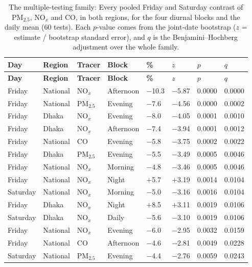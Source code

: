 \begingroup\scriptsize
\begin{longtable}{L{1.5cm} L{1.4cm} L{1.1cm} L{1.6cm} C{1.3cm} C{1.3cm} C{1.4cm} C{1.4cm}}
\caption{The multiple-testing family: Every pooled Friday and Saturday contrast of PM$_{2.5}$, NO$_x$ and CO, in both regions, for the four diurnal blocks and the daily mean (60 tests). Each $p$-value comes from the joint-date bootstrap ($z$ = estimate / bootstrap standard error), and $q$ is the Benjamini--Hochberg adjustment over the whole family.}\label{tab:s-bh}\\
\toprule
\textbf{Day} & \textbf{Region} & \textbf{Tracer} & \textbf{Block} & \textbf{\%} & \textbf{$z$} & \textbf{$p$} & \textbf{$q$} \\
\midrule\endfirsthead
\toprule
\textbf{Day} & \textbf{Region} & \textbf{Tracer} & \textbf{Block} & \textbf{\%} & \textbf{$z$} & \textbf{$p$} & \textbf{$q$} \\
\midrule\endhead
\bottomrule\endfoot
Friday & National & NO$_x$ & Afternoon & $-$10.3 & $-$5.87 & 0.0000 & 0.0000 \\
Friday & National & PM$_{2.5}$ & Evening & $-$7.6 & $-$4.56 & 0.0000 & 0.0002 \\
Friday & Dhaka & NO$_x$ & Evening & $-$8.0 & $-$4.05 & 0.0001 & 0.0010 \\
Friday & Dhaka & NO$_x$ & Afternoon & $-$7.4 & $-$3.94 & 0.0001 & 0.0012 \\
Friday & National & CO & Evening & $-$5.8 & $-$3.75 & 0.0002 & 0.0022 \\
Friday & Dhaka & PM$_{2.5}$ & Evening & $-$5.5 & $-$3.49 & 0.0005 & 0.0046 \\
Friday & National & NO$_x$ & Morning & $-$4.8 & $-$3.46 & 0.0005 & 0.0046 \\
Friday & National & NO$_x$ & Night & $+$5.7 & $+$3.19 & 0.0014 & 0.0104 \\
Saturday & National & NO$_x$ & Morning & $-$5.0 & $-$3.16 & 0.0016 & 0.0104 \\
Friday & Dhaka & NO$_x$ & Night & $+$8.5 & $+$3.11 & 0.0019 & 0.0106 \\
Saturday & Dhaka & NO$_x$ & Daily & $-$5.6 & $-$3.10 & 0.0019 & 0.0106 \\
Friday & National & NO$_x$ & Evening & $-$6.0 & $-$2.95 & 0.0032 & 0.0159 \\
Friday & National & CO & Afternoon & $-$4.6 & $-$2.81 & 0.0049 & 0.0228 \\
Saturday & National & PM$_{2.5}$ & Evening & $-$4.4 & $-$2.76 & 0.0059 & 0.0243 \\

\end{longtable}
